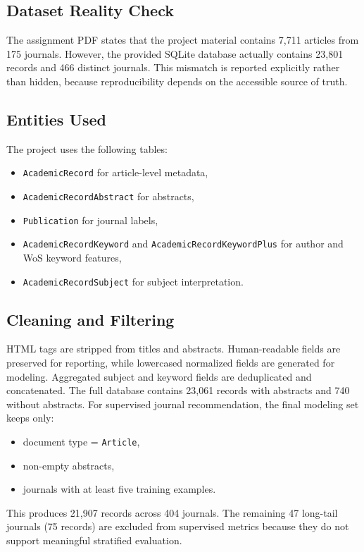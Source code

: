 \documentclass[conference]{IEEEtran}
\begin{document}
\subsection{Dataset Reality Check}
The assignment PDF states that the project material contains 7{,}711 articles from 175 journals. However, the provided SQLite database actually contains 23{,}801 records and 466 distinct journals. This mismatch is reported explicitly rather than hidden, because reproducibility depends on the accessible source of truth.

\subsection{Entities Used}
The project uses the following tables:
\begin{itemize}
\item \texttt{AcademicRecord} for article-level metadata,
\item \texttt{AcademicRecordAbstract} for abstracts,
\item \texttt{Publication} for journal labels,
\item \texttt{AcademicRecordKeyword} and \texttt{AcademicRecordKeywordPlus} for author and WoS keyword features,
\item \texttt{AcademicRecordSubject} for subject interpretation.
\end{itemize}

\subsection{Cleaning and Filtering}
HTML tags are stripped from titles and abstracts. Human-readable fields are preserved for reporting, while lowercased normalized fields are generated for modeling. Aggregated subject and keyword fields are deduplicated and concatenated. The full database contains 23{,}061 records with abstracts and 740 without abstracts. For supervised journal recommendation, the final modeling set keeps only:
\begin{itemize}
\item document type = \texttt{Article},
\item non-empty abstracts,
\item journals with at least five training examples.
\end{itemize}

This produces 21{,}907 records across 404 journals. The remaining 47 long-tail journals (75 records) are excluded from supervised metrics because they do not support meaningful stratified evaluation.
\end{document}
